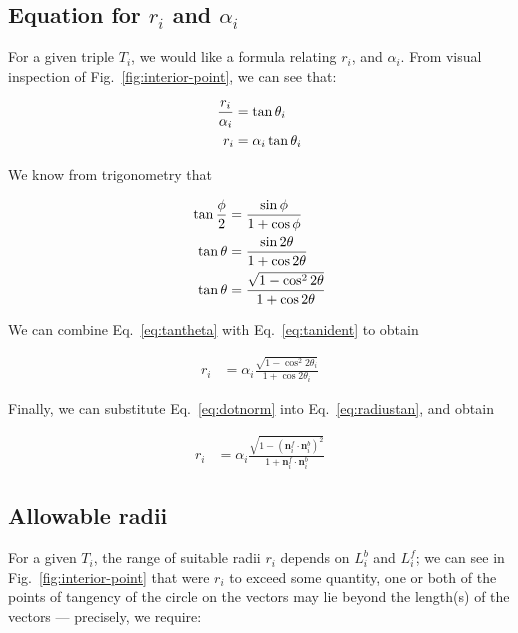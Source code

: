 \documentclass{article}
\begin{document}
\subsection{Equation for $r_i$ and $\alpha_{i}$}

For a given triple $T_{i}$, we would like a formula relating $r_{i}$, and $\alpha_{i}$.  From visual inspection of Fig.~\ref{fig:interior-point}, we can see that:

\begin{align}
  \notag
  \frac{r_i}{\alpha_{i}} &= \tan \theta_i\\
  \label{eq:tantheta}
  r_i &= \alpha_{i}\tan \theta_i
\end{align}

We know from trigonometry that

\begin{align}
  \notag
  \tan \frac{\phi}{2} &= \frac{\sin\phi}{1+\cos\phi}\\
  \notag
  \tan \theta &= \frac{\sin 2\theta}{1+\cos 2\theta}\\
  \label{eq:tanident}
  \tan \theta &= \frac{\sqrt{1-\cos^{2} 2\theta}}{1+\cos 2\theta}
\end{align}

We can combine Eq.~\eqref{eq:tantheta} with Eq.~\eqref{eq:tanident} to obtain

\begin{align}
  \label{eq:radiustan}
  r_{i} &= \alpha_i\frac{\sqrt{1-\cos^{2} 2\theta_i}}{1+\cos 2\theta_i}
\end{align}

Finally, we can substitute Eq.~\eqref{eq:dotnorm} into Eq.~\eqref{eq:radiustan}, and obtain

\begin{align}
  \label{eq:radius-alpha}
  r_{i} &= \alpha_i\frac{\sqrt{1-\left(\mathbf{n}^f_i\cdot \mathbf{n}^b_i\right)^{2}}}{1+\mathbf{n}^f_i\cdot \mathbf{n}^b_i}
\end{align}

\subsection{Allowable radii}

For a given $T_{i}$, the range of suitable radii $r_{i}$ depends on $L^b_i$ and $L^f_i$; we can see in Fig.~\ref{fig:interior-point} that were $r_{i}$ to exceed some quantity, one or both of the points of tangency of the circle on the vectors may lie beyond the length(s) of the vectors --- precisely, we require:
\end{document}
